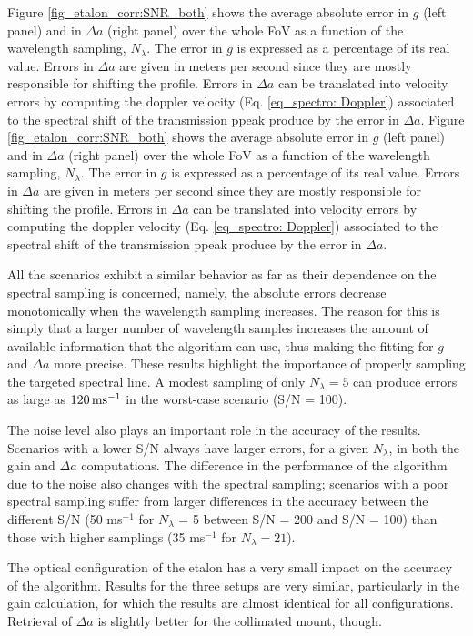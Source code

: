 Figure \ref{fig_etalon_corr:SNR_both} shows the average absolute error in $g$ (left panel) and in $\Delta a$ (right panel) over the whole FoV as a function of the wavelength sampling, $N_\lambda$. The error in $g$ is expressed as a percentage of its real value. Errors in $\Delta a$ are given in meters per second since they are mostly responsible for shifting the profile. Errors in $\Delta a$ can be translated into velocity errors by computing the doppler velocity (Eq. \eqref{eq_spectro: Doppler}) associated to the spectral shift of the transmission ppeak produce by the error in $\Delta a$.
Figure \ref{fig_etalon_corr:SNR_both} shows the average absolute error in $g$ (left panel) and in $\Delta a$ (right panel) over the whole FoV as a function of the wavelength sampling, $N_\lambda$. The error in $g$ is expressed as a percentage of its real value. Errors in $\Delta a$ are given in meters per second since they are mostly responsible for shifting the profile. Errors in $\Delta a$ can be translated into velocity errors by computing the doppler velocity (Eq. \eqref{eq_spectro: Doppler}) associated to the spectral shift of the transmission ppeak produce by the error in $\Delta a$.

All the scenarios exhibit a similar behavior as far as their dependence on the spectral sampling is concerned, namely, the absolute errors decrease monotonically when the wavelength sampling increases. The reason for this is simply that a larger number of wavelength samples increases the amount of available information that the algorithm can use, thus making the fitting for $g$ and $\Delta a$ more precise. These results highlight the importance of properly sampling the targeted spectral line. A modest sampling of only $N_\lambda=5$ can produce errors as large as $120 \, {\rm ms^{-1}}$ in the worst-case scenario (S/N = 100). 

The noise level also plays an important role in the accuracy of the results. Scenarios with a lower S/N always have larger errors, for a given $N_\lambda$, in both the gain and $\Delta a $ computations. The difference in the performance of the algorithm due to the noise also changes with the spectral sampling; scenarios with a poor spectral sampling suffer from larger differences in the accuracy between the different S/N (50 ms$^{-1}$ for $N_\lambda$ = 5 between S/N = 200 and S/N = 100) than those with higher samplings (35 ms$^{-1}$ for $N_\lambda = 21$).

The optical configuration of the etalon has a very small impact on the accuracy of the algorithm. Results for the three setups are very similar, particularly in the gain calculation, for which the results are almost identical for all configurations. Retrieval of $\Delta a$ is slightly better for the collimated mount, though.

